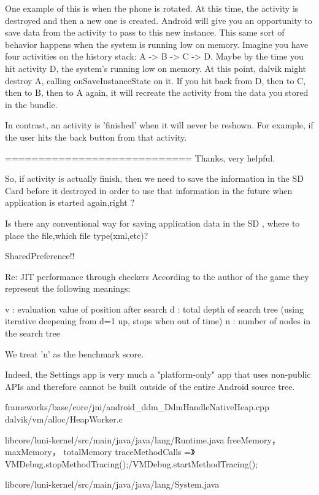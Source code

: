 \documentclass{book}
\begin{document}
\begin{CJK}{UTF8}{gbsn}
One example of this is when the phone is rotated. At this time, the activity is destroyed and then a new one is created. Android will give you an opportunity to save data from the activity to pass to this new instance. This same sort of behavior happens when the system is running low on memory. Imagine you have four activities on the history stack: A -> B -> C -> D. Maybe by the time you hit activity D, the system's running low on memory. At this point, dalvik might destroy A, calling onSaveInstanceState on it. If you hit back from D, then to C, then to B, then to A again, it will recreate the activity from the data you stored in the bundle. 

In contrast, an activity is 'finished' when it will never be reshown. For example, if the user hits the back button from that activity.

============================
Thanks, very helpful.

So, if activity is actually finish, then we need to save the information in the SD Card before it destroyed in order to use that information in the future when application is started again,right ?

Is there any conventional way for saving application data in the SD , where to place the file,which file type(xml,etc)?


SharedPreference!!


Re: JIT performance through checkers
According to the author of the game they represent the following meanings: 

v : evaluation value of position after search
d : total depth of search tree (using iterative deepening from d=1 up, stops when out of time)
n : number of nodes in the search tree 

We treat 'n' as the benchmark score.





Indeed, the Settings app is very much a "platform-only" app that uses
non-public APIs and therefore cannot be built outside of the entire
Android source tree.



frameworks/base/core/jni/android_ddm_DdmHandleNativeHeap.cpp
dalvik/vm/alloc/HeapWorker.c

libcore/luni-kernel/src/main/java/java/lang/Runtime.java
freeMemory， maxMemory， totalMemory
traceMethodCalls =》 VMDebug.stopMethodTracing();/VMDebug.startMethodTracing();

libcore/luni-kernel/src/main/java/java/lang/System.java


\end{CJK}
\end{document}
